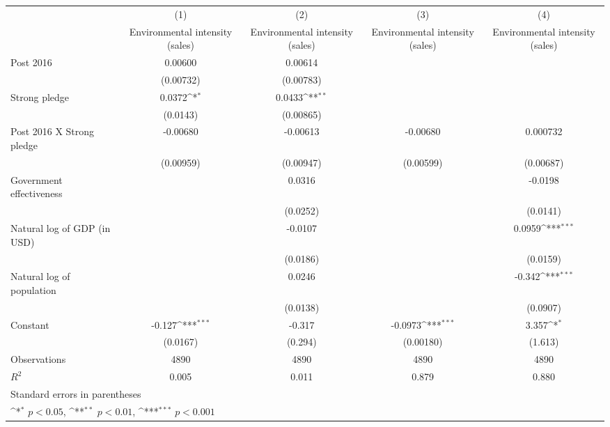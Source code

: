 {
\def\sym#1{\ifmmode^{#1}\else\(^{#1}\)\fi}
\begin{tabular}{l*{4}{c}}
\hline\hline
                    &\multicolumn{1}{c}{(1)}&\multicolumn{1}{c}{(2)}&\multicolumn{1}{c}{(3)}&\multicolumn{1}{c}{(4)}\\
                    &\multicolumn{1}{c}{Environmental intensity (sales)}&\multicolumn{1}{c}{Environmental intensity (sales)}&\multicolumn{1}{c}{Environmental intensity (sales)}&\multicolumn{1}{c}{Environmental intensity (sales)}\\
\hline
Post 2016           &     0.00600         &     0.00614         &                     &                     \\
                    &   (0.00732)         &   (0.00783)         &                     &                     \\
[1em]
Strong pledge       &      0.0372\sym{*}  &      0.0433\sym{**} &                     &                     \\
                    &    (0.0143)         &   (0.00865)         &                     &                     \\
[1em]
Post 2016 X Strong pledge&    -0.00680         &    -0.00613         &    -0.00680         &    0.000732         \\
                    &   (0.00959)         &   (0.00947)         &   (0.00599)         &   (0.00687)         \\
[1em]
Government effectiveness&                     &      0.0316         &                     &     -0.0198         \\
                    &                     &    (0.0252)         &                     &    (0.0141)         \\
[1em]
Natural log of GDP (in USD)&                     &     -0.0107         &                     &      0.0959\sym{***}\\
                    &                     &    (0.0186)         &                     &    (0.0159)         \\
[1em]
Natural log of population&                     &      0.0246         &                     &      -0.342\sym{***}\\
                    &                     &    (0.0138)         &                     &    (0.0907)         \\
[1em]
Constant            &      -0.127\sym{***}&      -0.317         &     -0.0973\sym{***}&       3.357\sym{*}  \\
                    &    (0.0167)         &     (0.294)         &   (0.00180)         &     (1.613)         \\
\hline
Observations        &        4890         &        4890         &        4890         &        4890         \\
\(R^{2}\)           &       0.005         &       0.011         &       0.879         &       0.880         \\
\hline\hline
\multicolumn{5}{l}{\footnotesize Standard errors in parentheses}\\
\multicolumn{5}{l}{\footnotesize \sym{*} \(p<0.05\), \sym{**} \(p<0.01\), \sym{***} \(p<0.001\)}\\
\end{tabular}
}
